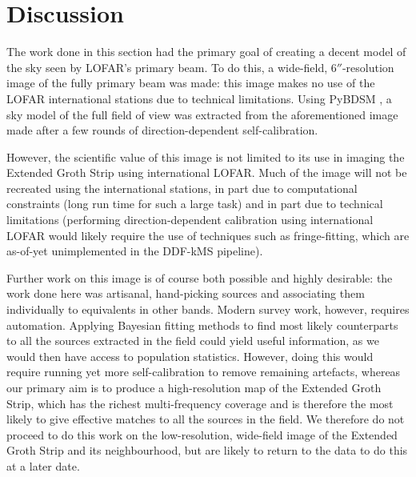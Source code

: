 \section{Discussion}

\pg
The work done in this section had the primary goal of creating a decent model of the sky seen by LOFAR's primary beam. To do this, a wide-field, $6''$-resolution image of the fully primary beam was made: this image makes no use of the LOFAR international stations due to technical limitations. Using PyBDSM , a sky model of the full field of view was extracted from the aforementioned image made after a few rounds of direction-dependent self-calibration.

\pg
However, the scientific value of this image is not limited to its use in imaging the Extended Groth Strip using international LOFAR. Much of the image will not be recreated using the international stations, in part due to computational constraints (long run time for such a large task) and in part due to technical limitations (performing direction-dependent calibration using international LOFAR would likely require the use of techniques such as fringe-fitting, which are as-of-yet unimplemented in the DDF-kMS pipeline). %

\pg
Further work on this image is of course both possible and highly desirable: the work done here was artisanal, hand-picking sources and associating them individually to equivalents in other bands. Modern survey work, however, requires automation. Applying Bayesian fitting methods to find most likely counterparts to all the sources extracted in the field could yield useful information, as we would then have access to population statistics. However, doing this would require running yet more self-calibration to remove remaining artefacts, whereas our primary aim is to produce a high-resolution map of the Extended Groth Strip, which has the richest multi-frequency coverage and is therefore the most likely to give effective matches to all the sources in the field. We therefore do not proceed to do this work on the low-resolution, wide-field image of the Extended Groth Strip and its neighbourhood, but are likely to return to the data to do this at a later date.



\clearpage